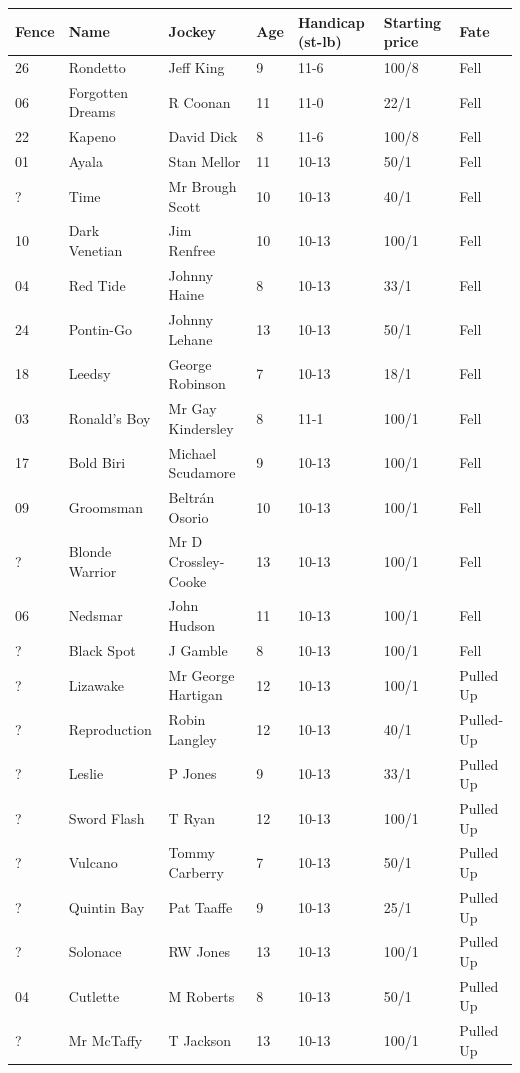 \documentclass{article}
\begin{document}
\begin{tabular}{lllllll}
\toprule
Fence & Name & Jockey & Age & Handicap (st-lb) & Starting price & Fate \\
\midrule
26 & Rondetto & Jeff King & 9 & 11-6 & 100/8 & Fell \\
06 & Forgotten Dreams & R Coonan & 11 & 11-0 & 22/1 & Fell \\
22 & Kapeno & David Dick & 8 & 11-6 & 100/8 & Fell \\
01 & Ayala & Stan Mellor & 11 & 10-13 & 50/1 & Fell \\
? & Time & Mr Brough Scott & 10 & 10-13 & 40/1 & Fell \\
10 & Dark Venetian & Jim Renfree & 10 & 10-13 & 100/1 & Fell \\
04 & Red Tide & Johnny Haine & 8 & 10-13 & 33/1 & Fell \\
24 & Pontin-Go & Johnny Lehane & 13 & 10-13 & 50/1 & Fell \\
18 & Leedsy & George Robinson & 7 & 10-13 & 18/1 & Fell \\
03 & Ronald's Boy & Mr Gay Kindersley & 8 & 11-1 & 100/1 & Fell \\
17 & Bold Biri & Michael Scudamore & 9 & 10-13 & 100/1 & Fell \\
09 & Groomsman & Beltrán Osorio & 10 & 10-13 & 100/1 & Fell \\
? & Blonde Warrior & Mr D Crossley-Cooke & 13 & 10-13 & 100/1 & Fell \\
06 & Nedsmar & John Hudson & 11 & 10-13 & 100/1 & Fell \\
? & Black Spot & J Gamble & 8 & 10-13 & 100/1 & Fell \\
? & Lizawake & Mr George Hartigan & 12 & 10-13 & 100/1 & Pulled Up \\
? & Reproduction & Robin Langley & 12 & 10-13 & 40/1 & Pulled-Up \\
? & Leslie & P Jones & 9 & 10-13 & 33/1 & Pulled Up \\
? & Sword Flash & T Ryan & 12 & 10-13 & 100/1 & Pulled Up \\
? & Vulcano & Tommy Carberry & 7 & 10-13 & 50/1 & Pulled Up \\
? & Quintin Bay & Pat Taaffe & 9 & 10-13 & 25/1 & Pulled Up \\
? & Solonace & RW Jones & 13 & 10-13 & 100/1 & Pulled Up \\
04 & Cutlette & M Roberts & 8 & 10-13 & 50/1 & Pulled Up \\
? & Mr McTaffy & T Jackson & 13 & 10-13 & 100/1 & Pulled Up \\

\end{tabular}
\end{document}
